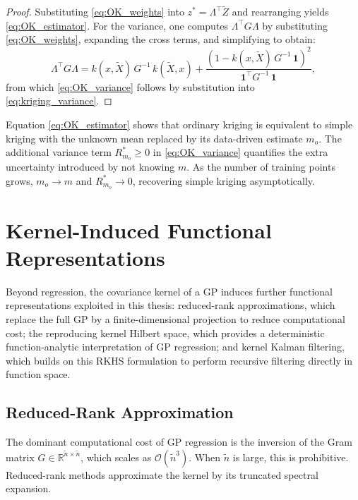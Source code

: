 \begin{proof}
    Substituting \eqref{eq:OK_weights} into $z^* = \Lambda^\top \tilde{Z}$
    and rearranging yields \eqref{eq:OK_estimator}. For the variance, one
    computes $\Lambda^\top G \Lambda$ by substituting \eqref{eq:OK_weights},
    expanding the cross terms, and simplifying to obtain:
    \begin{equation}
        \Lambda^\top G \Lambda = k(x,\tilde{X})\,G^{-1}\,k(\tilde{X},x)
        + \frac{\left(1 - k(x,\tilde{X})\,G^{-1}\,\mathbf{1}\right)^2}
          {\mathbf{1}^\top G^{-1}\,\mathbf{1}},
    \end{equation}
    from which \eqref{eq:OK_variance} follows by substitution into
    \eqref{eq:kriging_variance}.
\end{proof}

Equation \eqref{eq:OK_estimator} shows that ordinary kriging is equivalent to
simple kriging with the unknown mean replaced by its data-driven estimate
$m_o$. The additional variance term $R^*_{m_o} \geq 0$ in \eqref{eq:OK_variance}
quantifies the extra uncertainty introduced by not knowing $m$. As the number
of training points grows, $m_o \to m$ and $R^*_{m_o} \to 0$, recovering simple
kriging asymptotically.

\section{Kernel-Induced Functional Representations}
\label{sec:RKHS}

Beyond regression, the covariance kernel of a GP induces further
functional representations exploited in this thesis: reduced-rank
approximations, which replace the full GP by a finite-dimensional projection
to reduce computational cost; the reproducing kernel Hilbert space, which
provides a deterministic function-analytic interpretation of GP regression;
and kernel Kalman filtering, which builds on this RKHS formulation to perform
recursive filtering directly in function space.

\subsection{Reduced-Rank Approximation}
\label{sec:reduced_rank}

The dominant computational cost of GP regression is the inversion of the Gram
matrix $G \in \mathbb{R}^{\tilde{n} \times \tilde{n}}$, which scales as
$\mathcal{O}(\tilde{n}^3)$. When $\tilde{n}$ is large, this is prohibitive.
Reduced-rank methods approximate the kernel by its truncated spectral
expansion.

